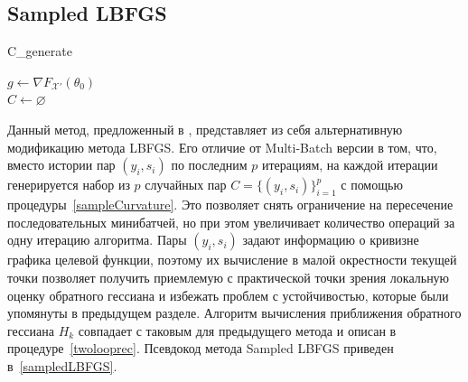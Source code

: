 \documentclass[preprint,12pt]{elsarticle}
\begin{document}
\subsection{Sampled LBFGS}
\begin{algorithm}[H]\label{sampleCurvature}
\caption {C\_generate}
\SetAlgoLined
{}
 $g \leftarrow \nabla F_{\mathcal{X}'}(\theta_0)$\\
 $C \leftarrow \varnothing$\\
\end{algorithm}
Данный метод, предложенный в \cite{sampledbfgs}, представляет из себя альтернативную модификацию метода LBFGS. 
Его отличие от Multi-Batch версии в том, что, вместо истории пар $(y_i, s_i)$ по последним $p$ итерациям, на каждой итерации генерируется набор из $p$ случайных пар $C = \{(y_i, s_i)\}_{i=1}^p$ с помощью процедуры~\ref{sampleCurvature}. 
Это позволяет снять ограничение на пересечение последовательных минибатчей, но при этом увеличивает количество операций за одну итерацию алгоритма. 
Пары $(y_i, s_i)$ задают информацию о кривизне графика целевой функции, поэтому их вычисление в малой окрестности текущей точки позволяет получить приемлемую с практической точки зрения локальную оценку обратного гессиана и избежать проблем с устойчивостью, которые были упомянуты в предыдущем разделе. 
Алгоритм вычисления приближения обратного гессиана $H_k$ совпадает с таковым для предыдущего метода и описан в процедуре~\ref{twolooprec}. Псевдокод метода Sampled LBFGS приведен в~\ref{sampledLBFGS}.
\end{document}
